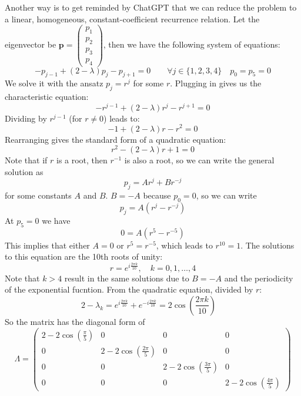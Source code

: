 \documentclass{article}
\begin{document}
Another way is to get reminded by ChatGPT that we can reduce the problem to a linear, homogeneous, constant-coefficient recurrence relation.
Let the eigenvector be $\mathbf{p} = \begin{pmatrix} p_1 \\ p_2 \\ p_3 \\ p_4 \end{pmatrix}$, then we have the following system of equations:
\[ - {p_{j - 1}} + \left( {2 - \lambda } \right){p_j} - {p_{j + 1}} = 0\qquad \forall j \in \{ 1,2,3,4\} \quad {p_0} = {p_5} = 0\]
We solve it with the ansatz $p_j = r^j$ for some $r$. Plugging in gives us the characteristic equation:
\[ - r^{j-1} + (2 - \lambda) r^j - r^{j+1} = 0 \]
Dividing by $r^{j-1}$ (for $r \neq 0$) leads to:
\[ - 1 + (2 - \lambda) r - r^2 = 0 \]
Rearranging gives the standard form of a quadratic equation:
\[ r^2 - (2 - \lambda) r + 1 = 0 \]
Note that if $r$ is a root, then $r^{-1}$ is also a root, so we can write the general solution as
\[ p_j = A r^j + B r^{-j} \]
for some constants $A$ and $B$. $B=-A$ because $p_0 = 0$, so we can write
\[ p_j = A \left( r^j - r^{-j} \right) \]
At $p_5  =0$ we have
\[ 0 = A \left( r^5 - r^{-5} \right) \]
This implies that either $A = 0$ or $r^5 = r^{-5}$, which leads to $r^{10} = 1$. The solutions to this equation are the 10th roots of unity:
\[ r = e^{i\frac{2\pi k}{10}}, \quad k = 0, 1, \ldots, 4 \]
Note that $k>4$ result in the same solutions due to $B=-A$ and the periodicity of the exponential fucntion. From the quadratic equation, divided by $r$:
\[2-\lambda_k = e^{i\frac{2\pi k}{10}} + e^{-i\frac{2\pi k}{10}} = 2 \cos\left(\frac{2\pi k}{10}\right)\quad \]
So the matrix has the diagonal form of
\[
    \Lambda = \begin{pmatrix}
        2 - 2\cos\left(\frac{\pi}{5}\right) & 0                                    & 0                                    & 0                                    \\
        0                                   & 2 - 2\cos\left(\frac{2\pi}{5}\right) & 0                                    & 0                                    \\
        0                                   & 0                                    & 2 - 2\cos\left(\frac{3\pi}{5}\right) & 0                                    \\
        0                                   & 0                                    & 0                                    & 2 - 2\cos\left(\frac{4\pi}{5}\right)
    \end{pmatrix}
\]
\end{document}
